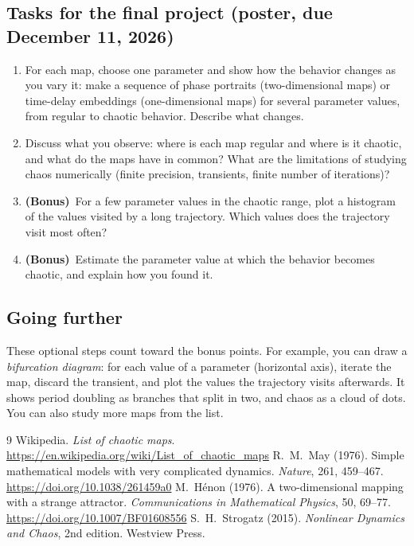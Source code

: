 \documentclass[11pt,a4paper]{article}
\newcommand{\bonus}{\textbf{(Bonus)}}
\begin{document}
\subsection*{Tasks for the final project (poster, due December 11, 2026)}
\begin{enumerate}
  \item For each map, choose one parameter and show how the behavior changes
        as you vary it: make a sequence of phase portraits (two-dimensional
        maps) or time-delay embeddings (one-dimensional maps) for several
        parameter values, from regular to chaotic behavior. Describe what
        changes.
  \item Discuss what you observe: where is each map regular and where is it
        chaotic, and what do the maps have in common? What are the
        limitations of studying chaos numerically (finite precision,
        transients, finite number of iterations)?
  \item \bonus\ For a few parameter values in the chaotic range, plot a
        histogram of the values visited by a long trajectory. Which values
        does the trajectory visit most often?
  \item \bonus\ Estimate the parameter value at which the behavior becomes
        chaotic, and explain how you found it.
\end{enumerate}

\subsection*{Going further}
These optional steps count toward the bonus points. For example, you can draw
a \emph{bifurcation diagram}: for each value of a parameter (horizontal
axis), iterate the map, discard the transient, and plot the values the
trajectory visits afterwards. It shows period doubling as branches that
split in two, and chaos as a cloud of dots. You can also study more maps
from the list.

\begin{thebibliography}{9}
   Wikipedia. \emph{List of chaotic maps}.
    \url{https://en.wikipedia.org/wiki/List_of_chaotic_maps}
   R.~M.~May (1976). Simple mathematical models with very
    complicated dynamics. \emph{Nature}, 261, 459--467.
    \url{https://doi.org/10.1038/261459a0}
   M.~H\'enon (1976). A two-dimensional mapping with a strange
    attractor. \emph{Communications in Mathematical Physics}, 50, 69--77.
    \url{https://doi.org/10.1007/BF01608556}
   S.~H.~Strogatz (2015). \emph{Nonlinear Dynamics and
    Chaos}, 2nd edition. Westview Press.
\end{thebibliography}
\end{document}

